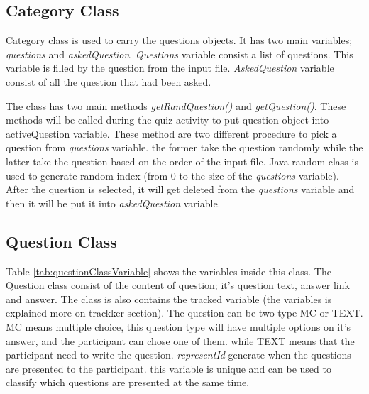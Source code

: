 \subsection{Category Class}
Category class is used to carry the questions objects.
It has two main variables; \textit{questions} and \textit{askedQuestion}.
\textit{Questions} variable consist a list of questions. This variable is filled by
the question from the input file.
\textit{AskedQuestion} variable consist of all the question that had been asked.

The class has two main methods \textit{getRandQuestion()} and \textit{getQuestion()}.
These methods will be called during the quiz activity to put question object into activeQuestion variable.
These method are two different procedure to pick a question from \textit{questions} variable.
the former take the question randomly while the latter take the question based on the order of the input file.
Java random class is used to generate random index (from 0 to the size of the \textit{questions} variable).
After the question is selected, it will get deleted from the \textit{questions} variable and then it will be put it into \textit{askedQuestion} variable.

\subsection{Question Class}
Table \ref{tab:questionClassVariable} shows the variables inside this class.
The Question class consist of the content of question; it's question text, answer link and answer.
The class is also contains the tracked variable (the variables is explained more on trackker section).
The question can be two type MC or TEXT. MC means multiple choice, this question type will have multiple options on it's answer,
and the participant can chose one of them. while TEXT means that the participant need to write the question.
\textit{representId} generate when the questions are presented to the participant. this variable is unique and can
be used to classify which questions are presented at the same time.

